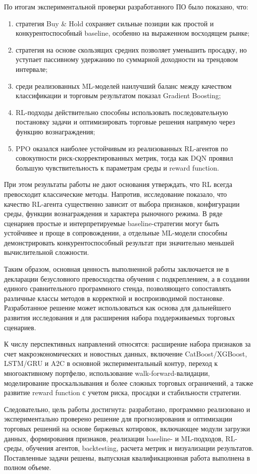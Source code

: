 По итогам экспериментальной проверки разработанного ПО было показано, что:
\begin{enumerate}[leftmargin=1.25cm,label=\arabic*)]
\item стратегия Buy \& Hold сохраняет сильные позиции как простой и конкурентоспособный baseline, особенно на выраженном восходящем рынке;
\item стратегия на основе скользящих средних позволяет уменьшить просадку, но уступает пассивному удержанию по суммарной доходности на трендовом интервале;
\item среди реализованных ML-моделей наилучший баланс между качеством классификации и торговым результатом показал Gradient Boosting;
\item RL-подходы действительно способны использовать последовательную постановку задачи и оптимизировать торговые решения напрямую через функцию вознаграждения;
\item PPO оказался наиболее устойчивым из реализованных RL-агентов по совокупности риск-скорректированных метрик, тогда как DQN проявил большую чувствительность к параметрам среды и reward function.
\end{enumerate}

При этом результаты работы не дают основания утверждать, что RL всегда превосходит классические методы. Напротив, исследование показало, что качество RL-агента существенно зависит от выбора признаков, конфигурации среды, функции вознаграждения и характера рыночного режима. В ряде сценариев простые и интерпретируемые baseline-стратегии могут быть устойчивее и проще в сопровождении, а отдельные ML-модели способны демонстрировать конкурентоспособный результат при значительно меньшей вычислительной сложности.

Таким образом, основная ценность выполненной работы заключается не в декларации безусловного превосходства обучения с подкреплением, а в создании единого сравнительного программного стенда, позволяющего сопоставлять различные классы методов в корректной и воспроизводимой постановке. Разработанное решение может использоваться как основа для дальнейшего развития исследования и для расширения набора поддерживаемых торговых сценариев.

К числу перспективных направлений относятся: расширение набора признаков за счет макроэкономических и новостных данных, включение CatBoost/XGBoost, LSTM/GRU и A2C в основной экспериментальный контур, переход к многоактивному портфелю, использование walk-forward-валидации, моделирование проскальзывания и более сложных торговых ограничений, а также развитие reward function с учетом риска, просадки и стабильности стратегии.

Следовательно, цель работы достигнута: разработано, программно реализовано и экспериментально проверено решение для прогнозирования и оптимизации торговых решений на основе биржевых котировок, включающее модули загрузки данных, формирования признаков, реализации baseline- и ML-подходов, RL-среды, обучения агентов, backtesting, расчета метрик и визуализации результатов. Поставленные задачи решены, выпускная квалификационная работа выполнена в полном объеме.
